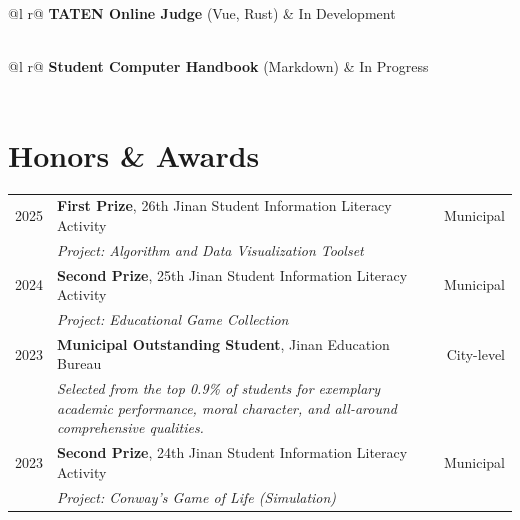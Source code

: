 \documentclass[a4paper,12pt]{article}
\begin{document}
\vspace{4pt}

\begin{tabularx}{\linewidth}{ @{}l r@{} }
\textbf{TATEN Online Judge} \small{(Vue, Rust)} & \hfill In Development \\[3.75pt]
  \\
\end{tabularx}

\vspace{4pt}

\begin{tabularx}{\linewidth}{ @{}l r@{} }
\textbf{Student Computer Handbook} \small{(Markdown)} & \hfill In Progress \\[3.75pt]
  \\
\end{tabularx}

\section{Honors \& Awards}

\begin{tabularx}{\linewidth}{@{}l X r@{}}
2025 & \textbf{First Prize}, 26th Jinan Student Information Literacy Activity & Municipal \\
     & \textit{Project: Algorithm and Data Visualization Toolset} & \\
2024 & \textbf{Second Prize}, 25th Jinan Student Information Literacy Activity & Municipal \\
     & \textit{Project: Educational Game Collection} & \\
2023 & \textbf{Municipal Outstanding Student}, Jinan Education Bureau & City-level \\
     & \textit{Selected from the top 0.9\% of students for exemplary academic performance, moral character, and all-around comprehensive qualities.} & \\
2023 & \textbf{Second Prize}, 24th Jinan Student Information Literacy Activity & Municipal \\
     & \textit{Project: Conway's Game of Life (Simulation)} & \\
\end{tabularx}
\end{document}
